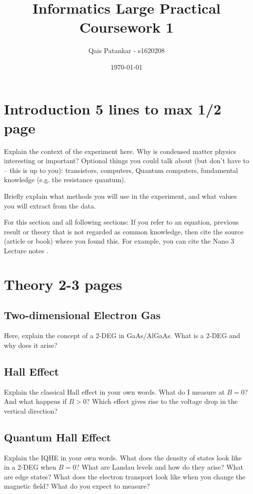 \documentclass[a4paper]{article}
\title{Informatics Large Practical \\ \large{Coursework 1}}
\author{Qais Patankar - s1620208}
\date{\today}
\begin{document}
      \maketitle
      
      \section{Introduction 5 lines to max 1/2 page}
      \label{sec:introduction}
      
      Explain the context of the experiment here. Why is condensed matter physics interesting or important?
      Optional things you could talk about (but don't have to -- this is up to you): transistors, computers, Quantum computers, fundamental knowledge (e.g. the resistance quantum).
      
      Briefly explain what methods you will use in the experiment, and what values you will extract from the data.
      
      For this section and all following sections: If you refer to an equation, previous result or theory that is not regarded as common knowledge, then cite the source (article or book) where you found this. For example, you can cite the Nano 3 Lecture notes \cite{nano3}.
      
      \section{Theory 2-3 pages}
      \label{sec:theory}
      
      \subsection{Two-dimensional Electron Gas}
      Here, explain the concept of a 2-DEG in GaAs/AlGaAs. What is a 2-DEG and why does it arise?
      
      \subsection{Hall Effect}
      Explain the classical Hall effect in your own words. What do I measure at $B=0$? And what happens if $B>0$? Which effect gives rise to the voltage drop in the vertical direction?
      
      \subsection{Quantum Hall Effect}
      Explain the IQHE in your own words. What does the density of states look like in a 2-DEG when $B=0$? What are Landau levels and how do they arise? What are edge states? What does the electron transport look like when you change the magnetic field? What do you expect to measure?
      
\end{document}
